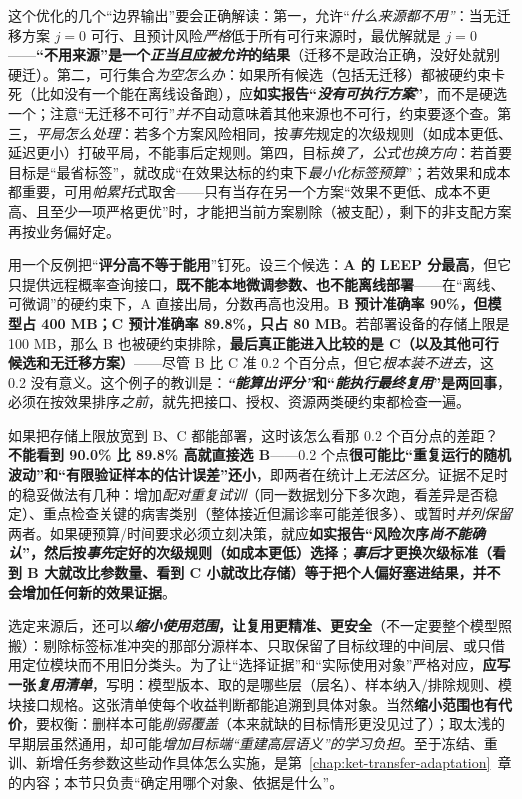 这个优化的几个“边界输出”要会正确解读：第一，允许“\emph{什么来源都不用”}：当无迁移方案 $j=0$ 可行、且预计风险\emph{严格}低于所有可行来源时，最优解就是 $j=0$——\textbf{“不用来源”是一个\emph{正当且应被允许}的结果}（迁移不是政治正确，没好处就别硬迁）。第二，可行集合\emph{为空怎么办}：如果所有候选（包括无迁移）都被硬约束卡死（比如没有一个能在离线设备跑），应\textbf{如实报告“\emph{没有可执行方案}”}，而不是硬选一个；注意“无迁移不可行”\emph{并不}自动意味着其他来源也不可行，约束要逐个查。第三，\emph{平局怎么处理}：若多个方案风险相同，按\emph{事先}规定的次级规则（如成本更低、延迟更小）打破平局，不能事后定规则。第四，目标\emph{换了，公式也换方向}：若首要目标是“最省标签”，就改成“在效果达标的约束下\emph{最小化标签预算}”；若效果和成本都重要，可用\emph{帕累托}式取舍——只有当存在另一个方案“效果不更低、成本不更高、且至少一项严格更优”时，才能把当前方案剔除（被支配），剩下的非支配方案再按业务偏好定。

用一个反例把“\textbf{评分高不等于能用}”钉死。设三个候选：\textbf{A 的 LEEP 分最高}，但它只提供远程概率查询接口，\textbf{既不能本地微调参数、也不能离线部署}——在“离线、可微调”的硬约束下，A 直接出局，分数再高也没用。\textbf{B 预计准确率 90\%，但模型占 400 MB；C 预计准确率 89.8\%，只占 80 MB}。若部署设备的存储上限是 100 MB，那么 B 也被硬约束排除，\textbf{最后真正能进入比较的是 C（以及其他可行候选和无迁移方案）}——尽管 B 比 C 准 0.2 个百分点，但它\emph{根本装不进去}，这 0.2 没有意义。这个例子的教训是：\textbf{\emph{“能算出评分”}和“\emph{能执行最终复用}”是两回事}，必须在按效果排序\emph{之前}，就先把接口、授权、资源两类硬约束都检查一遍。

如果把存储上限放宽到 B、C 都能部署，这时该怎么看那 0.2 个百分点的差距？\textbf{不能看到 90.0\% 比 89.8\% 高就直接选 B}——0.2 个点\textbf{很可能比“重复运行的随机波动”和“有限验证样本的估计误差”还小}，即两者在统计上\emph{无法区分}。证据不足时的稳妥做法有几种：增加\emph{配对重复试训}（同一数据划分下多次跑，看差异是否稳定）、重点检查关键的病害类别（整体接近但漏诊率可能差很多）、或暂时\emph{并列保留}两者。如果硬预算/时间要求必须立刻决策，就应\textbf{如实报告“风险次序\emph{尚不能确认}”，然后按\emph{事先}定好的次级规则（如成本更低）选择}；\textbf{\emph{事后}才更换次级标准（看到 B 大就改比参数量、看到 C 小就改比存储）等于把个人偏好塞进结果，并不会增加任何新的效果证据}。

选定来源后，还可以\textbf{\emph{缩小使用范围}，让复用更精准、更安全}（不一定要整个模型照搬）：剔除标签标准冲突的那部分源样本、只取保留了目标纹理的中间层、或只借用定位模块而不用旧分类头。为了让“选择证据”和“实际使用对象”严格对应，\textbf{应写一张\emph{复用清单}}，写明：模型版本、取的是哪些层（层名）、样本纳入/排除规则、模块接口规格。这张清单使每个收益判断都能追溯到具体对象。当然\textbf{缩小范围也有代价}，要权衡：删样本可能\emph{削弱覆盖}（本来就缺的目标情形更没见过了）；取太浅的早期层虽然通用，却可能\emph{增加目标端“重建高层语义”的学习负担}。至于冻结、重训、新增任务参数这些动作具体怎么实施，是第~\ref{chap:ket-transfer-adaptation}~章的内容；本节只负责“确定用哪个对象、依据是什么”。

